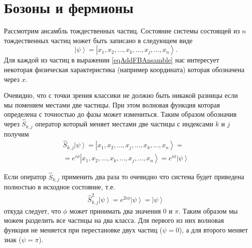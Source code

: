 \section{Бозоны и фермионы}
\label{AddFermionBoson}

Рассмотрим ансамбль тождественных частиц. Состояние системы состоящей
из $n$ тождественных частиц может быть записано в следующем виде
\begin{equation}
  \left|\psi\right> = \left|x_1, x_2, \dots, x_k, \dots, x_j, \dots,
  x_n\right>.
  \label{eqAddFBAnsamble}
\end{equation}
Для каждой из частиц в выражении \eqref{eqAddFBAnsamble} нас
интересует некоторая физическая характеристика (например координата)
которая обозначена через $x$.

Очевидно, что с точки зрения
классики не должно быть никакой разницы если мы поменяем местами две
частицы. При этом волновая функция которая определена с точностью до
фазы может измениться. Таким образом обозначив через
$\hat{S}_{k,j}$ оператор который меняет местами две частицы с
индексами $k$ и $j$ получим 
\begin{eqnarray}
  \hat{S}_{k, j} \left|\psi\right> = \left|x_1, x_2, \dots, x_j,
  \dots, x_k, \dots,  x_n\right> =
  \nonumber \\
  = e^{i \phi} \left|x_1, x_2, \dots, x_k, \dots, x_j, \dots,
  x_n\right> = e^{i \phi} \left|\psi\right>
  \nonumber
\end{eqnarray}

Если оператор $\hat{S}_{k,j}$ применить два раза то очевидно что
система будет приведена полностью в исходное состояние, т.е.
\begin{eqnarray}
  \hat{S}_{k, j}^2 \left|\psi\right> =
  e^{2 i \phi} \left|\psi\right> = \left|\psi\right>
  \nonumber
\end{eqnarray}
откуда следует, что $\phi$ может принимать два значения $0$ и $\pi$.
Таким образом мы можем разделить все частицы на два класса. Для
первого из них волновая функция не меняется при перестановке двух
частиц ($\psi = 0$), а для второго меняет знак ($\psi = \pi$).


